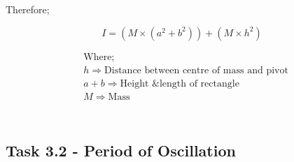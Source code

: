 \documentclass[12pt]{article}
\begin{document}
Therefore;

\begin{equation} \label{Final}
{I = (M \times (a^2 + b^2)) + (M \times h^2)}
\end{equation}

\begin{equation*}
\begin{split}
&\text{Where;} \\
&h \Rightarrow \text{Distance between centre of mass and pivot} \\
&a+b \Rightarrow \text{Height \& length of rectangle} \\
&M \Rightarrow \text{Mass} \\
\end{split}
\end{equation*} \\


\subsection{Task 3.2 - Period of Oscillation}
\label{Task 3.2 - Period of Oscillation}
\end{document}
